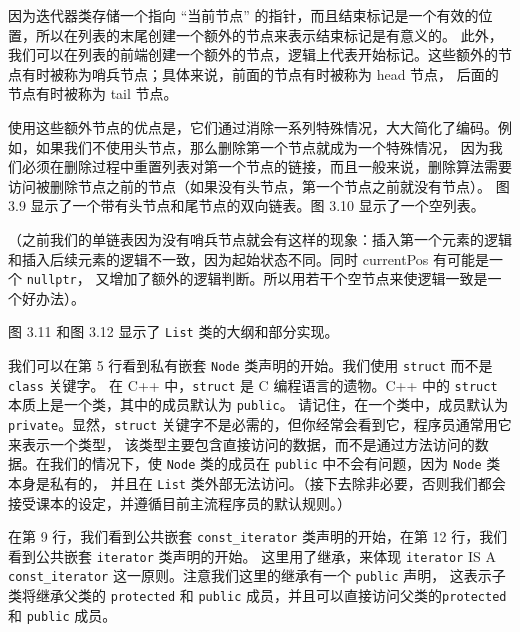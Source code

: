 \documentclass[a4paper]{ctexart}
\theoremstyle{definition}
\theoremstyle{definition}
\begin{document}
因为迭代器类存储一个指向 ``当前节点'' 的指针，而且结束标记是一个有效的位置，所以在列表的末尾创建一个额外的节点来表示结束标记是有意义的。
此外，我们可以在列表的前端创建一个额外的节点，逻辑上代表开始标记。这些额外的节点有时被称为哨兵节点；具体来说，前面的节点有时被称为 head 节点，
后面的节点有时被称为 tail 节点。

使用这些额外节点的优点是，它们通过消除一系列特殊情况，大大简化了编码。例如，如果我们不使用头节点，那么删除第一个节点就成为一个特殊情况，
因为我们必须在删除过程中重置列表对第一个节点的链接，而且一般来说，删除算法需要访问被删除节点之前的节点（如果没有头节点，第一个节点之前就没有节点）。
图 3.9 显示了一个带有头节点和尾节点的双向链表。图 3.10 显示了一个空列表。
  
（之前我们的单链表因为没有哨兵节点就会有这样的现象：插入第一个元素的逻辑和插入后续元素的逻辑不一致，因为起始状态不同。同时 currentPos 有可能是一个 \verb|nullptr|，
又增加了额外的逻辑判断。所以用若干个空节点来使逻辑一致是一个好办法）。

图 3.11 和图 3.12 显示了 \verb|List| 类的大纲和部分实现。

我们可以在第 5 行看到私有嵌套 \verb|Node| 类声明的开始。我们使用 \verb|struct| 而不是 \verb|class| 关键字。
在 C++ 中，\verb|struct| 是 C 编程语言的遗物。C++ 中的 \verb|struct| 本质上是一个类，其中的成员默认为 \verb|public|。
请记住，在一个类中，成员默认为 \verb|private|。显然，\verb|struct| 关键字不是必需的，但你经常会看到它，程序员通常用它来表示一个类型，
该类型主要包含直接访问的数据，而不是通过方法访问的数据。在我们的情况下，使 \verb|Node| 类的成员在 \verb|public| 中不会有问题，因为 \verb|Node| 类本身是私有的，
并且在 \verb|List| 类外部无法访问。（接下去除非必要，否则我们都会接受课本的设定，并遵循目前主流程序员的默认规则。）

在第 9 行，我们看到公共嵌套 \verb|const_iterator| 类声明的开始，在第 12 行，我们看到公共嵌套 \verb|iterator| 类声明的开始。
这里用了继承，来体现 \verb|iterator| IS A \verb|const_iterator| 这一原则。注意我们这里的继承有一个 \verb|public| 声明，
这表示子类将继承父类的 \verb|protected| 和 \verb|public| 成员，并且可以直接访问父类的\verb|protected| 和 \verb|public| 成员。
\end{document}
